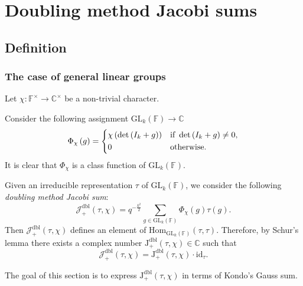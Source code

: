 \documentclass[12pt, reqno]{amsart}
\theoremstyle{definition}
\theoremstyle{definition}
\theoremstyle{definition}
\newcommand{\cComplex}{\mathbb{C}}
\newcommand{\multiplicativegroup}[1]{#1^{\times}}
\newcommand{\Hom}{\mathrm{Hom}}
\newcommand{\idmap}{\mathrm{id}}
\newcommand{\IdentityMatrix}[1]{I_{#1}}
\newcommand{\GL}{\mathrm{GL}}
\newcommand{\finiteField}{\mathbb{F}}
\newcommand{\posDblJacobiSum}[2]{\mathcal{J}_{+}^{\mathrm{dbl}}\left(#1, #2\right)}
\newcommand{\posDblJacobiSumScalar}[2]{\mathrm{J}_{+}^{\mathrm{dbl}}\left(#1, #2\right)}
\begin{document}
\section{Doubling method Jacobi sums}

\subsection{Definition}

\subsubsection{The case of general linear groups}

Let $\chi \colon \multiplicativegroup{\finiteField} \to \multiplicativegroup{\cComplex}$ be a non-trivial character.

Consider the following assignment $\GL_k\left(\finiteField\right) \to \cComplex$
$$\Phi_{\chi}\left(g\right) = \begin{dcases}
	\chi\left(\det\left(\IdentityMatrix{k}+g\right)\right) & \text{if }\det\left(\IdentityMatrix{k}+g\right) \ne 0,\\
	0 & \text{otherwise.}
\end{dcases}$$
It is clear that $\Phi_{\chi}$ is a class function of $\GL_k\left(\finiteField\right)$.

Given an irreducible representation $\tau$ of $\GL_k\left(\finiteField\right)$, we consider the following \emph{doubling method Jacobi sum}:
$$\posDblJacobiSum{\tau}{\chi} = q^{-\frac{k^2}{2}} \sum_{g \in \GL_k\left(\finiteField\right)} \Phi_{\chi}\left(g\right) \tau\left(g\right).$$
Then $\posDblJacobiSum{\tau}{\chi}$ defines an element of $\Hom_{\GL_k\left(\finiteField\right)}\left(\tau, \tau\right)$. Therefore, by Schur's lemma there exists a complex number $\posDblJacobiSumScalar{\tau}{\chi} \in \cComplex$ such that $$\posDblJacobiSum{\tau}{\chi} = \posDblJacobiSumScalar{\tau}{\chi} \cdot \idmap_\tau.$$ 

The goal of this section is to express $\posDblJacobiSumScalar{\tau}{\chi}$ in terms of Kondo's Gauss sum.
\end{document}
